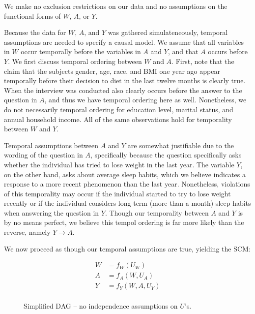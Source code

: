\documentclass{article}
\begin{document}
We make no exclusion restrictions on our data and no assumptions on the functional forms of $W$, $A$, or $Y$.

Because the data for $W$, $A$, and $Y$ was gathered simulateneously, temporal assumptions are needed to specify a causal model. We assume that all variables in $W$ occur temporally before the variables in $A$ and $Y$, and that $A$ occurs before $Y$. We first discuss temporal ordering between $W$ and $A$. First, note that the claim that the subjects gender, age, race, and BMI one year ago appear temporally before their decision to diet in the last twelve months is clearly true. When the interview was conducted also clearly occurs before the answer to the question in $A$, and thus we have temporal ordering here as well. Nonetheless, we do not necessarily temporal ordering for education level, marital status, and annual household income. All of the same observations hold for temporality between $W$ and $Y$.

Temporal assumptions between $A$ and $Y$ are somewhat justifiable due to the wording of the question in $A$, specifically because the question specifically asks whether the individual has tried to lose weight in the last year. The variable $Y$, on the other hand, asks about average sleep habits, which we believe indicates a response to a more recent phenomenon than the last year. Nonetheless, violations of this temporality may occur if the individual started to try to lose weight recently or if the individual considers long-term (more than a month) sleep habits when answering the question in $Y$. Though our temporality between $A$ and $Y$ is by no means perfect, we believe this tempol ordering is far more likely than the reverse, namely $Y\rightarrow A$. 

We now proceed as though our temporal assumptions are true, yielding the SCM:

\begin{align*}
W &= f_{W}(U_{W}) \\
A &= f_{A}(W,U_{A}) \\
Y &= f_{Y}(W,A,U_{Y}) \\
\end{align*}

\begin{figure}[h]
    \centering
  \caption{Simplified DAG -- no independence assumptions on $U$'s.}
  \label{fig:DAG}
\end{figure}
\end{document}
